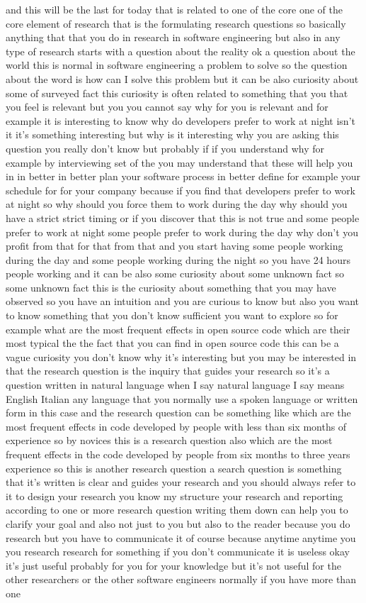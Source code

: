 \documentclass[conference, compsoc, twoside]{IEEEtran}
\begin{document}
and this will be the last for today that is related to one of the core one of the core element of research that is the formulating research questions so basically anything that that you do in research in software engineering but also in any type of research starts with a question about the reality ok a question about the world this is normal in software engineering a problem to solve so the question about the word is how can I solve this problem but it can be also curiosity about some of surveyed fact this curiosity is often related to something that you that you feel is relevant but you you cannot say why for you is relevant and for example it is interesting to know why do developers prefer to work at night isn't it it's something interesting but why is it interesting why you are asking this question you really don't know but probably if if you understand why for example by interviewing set of the you may understand that these will help you in in better in better plan your software process in better define for example your schedule for for your company because if you find that developers prefer to work at night so why should you force them to work during the day why should you have a strict strict timing or if you discover that this is not true and some people prefer to work at night some people prefer to work during the day why don't you profit from that for that from that and you start having some people working during the day and some people working during the night so you have 24 hours people working and it can be also some curiosity about some unknown fact so some unknown fact this is the curiosity about something that you may have observed so you have an intuition and you are curious to know but also you want to know something that you don't know sufficient you want to explore so for example what are the most frequent effects in open source code which are their most typical the the fact that you can find in open source code this can be a vague curiosity you don't know why it's interesting but you may be interested in that the research question is the inquiry that guides your research so it's a question written in natural language when I say natural language I say means English Italian any language that you normally use a spoken language or written form in this case and the research question can be something like which are the most frequent effects in code developed by people with less than six months of experience so by novices this is a research question also which are the most frequent effects in the code developed by people from six months to three years experience so this is another research question a search question is something that it's written is clear and guides your research and you should always refer to it to design your research you know my structure your research and reporting according to one or more research question writing them down can help you to clarify your goal and also not just to you but also to the reader because you do research but you have to communicate it of course because anytime anytime you you research research for something if you don't communicate it is useless okay it's just useful probably for you for your knowledge but it's not useful for the other researchers or the other software engineers normally if you have more than one 
\end{document}
